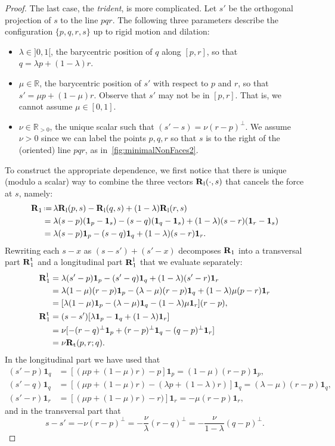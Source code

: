 \documentclass{amsart}
\theoremstyle{definition}
\newcommand{\R}{\mathbb{R}} %
\renewcommand{\b}[1]{{\boldsymbol{#1}}} %
\newcommand{\one}{\mathbf{1}} %
\newcommand{\eqdef}{\mbox{\,\raisebox{0.2ex}{\scriptsize\ensuremath{\mathrm:}}\ensuremath{=}\,}} %
\newcommand{\Rvector}{\b{\rm R}} %
\newcommand{\lon}{\operatorname{l}} %
\newcommand{\trans}{\operatorname{t}} %
\newcommand{\Rlong}{\Rvector_{\lon}} %
\newcommand{\Rtrans}{\Rvector_{\trans}} %
\begin{document}
\begin{proof}
\medskip
The last case, the \emph{trident}, is more complicated. Let $s'$ be the orthogonal projection of $s$ to the line $pqr$.
The following three parameters  describe the configuration $\{p,q,r,s\}$ up to rigid motion and dilation: 
\begin{itemize}
\item $\lambda\in {]0,1[}$, the barycentric position of $q$ along $[p,r]$, so that $q=\lambda p + (1-\lambda) r$.
\item $\mu\in \R$, the barycentric position of $s'$ with respect to  $p$ and $r$, so that $s'=\mu p + (1-\mu) r$. Observe that $s'$ may not be in $[p,r]$. That is, we cannot assume $\mu\in [0,1]$.
\item $\nu \in \R_{>0}$, the unique scalar such that $(s'-s) = \nu (r-p)^\perp$. We assume $\nu >0$ since we can label the points $p,q,r$ so that $s$ is to the right of the (oriented) line $pqr$, as in~\cref{fig:minimalNonFaces2}.
\end{itemize}

To construct the appropriate dependence, we first notice that there is unique (modulo a scalar) way to combine the three vectors $\Rlong(\cdot, s)$ that cancels the force at $s$, namely:
\begin{align*}
\Rvector_1 & \eqdef \lambda \Rlong(p,s) -  \Rlong(q,s) + (1-\lambda)\Rlong(r,s) \\
& = \lambda (s-p) (\one_p  - \one_s) - (s-q) (\one_q  - \one_s) + (1-\lambda) (s-r) (\one_r  - \one_s)\\
& = \lambda (s-p) \one_p  - (s-q) \one_q + (1-\lambda) (s-r) \one_r.
\end{align*}
Rewriting each $s-x$ as $(s-s')+(s'-x)$ decomposes $\Rvector_1$ into a transversal  part $\Rvector_1^{\trans}$ and a longitudinal part  $\Rvector_1^{\lon}$ that we evaluate separately:
\begin{align*}
\Rvector_1^{\lon} & = \lambda (s'-p) \one_p  - (s'-q) \one_q + (1-\lambda) (s'-r) \one_r\\
& = \lambda (1-\mu) (r-p) \one_p   - (\lambda - \mu) (r-p) \one_q  + (1-\lambda) \mu (p-r) \one_r\\
& = [\lambda (1-\mu)  \one_p   - (\lambda - \mu) \one_q  - (1-\lambda) \mu \one_r](r-p),\\
\Rvector_1^{\trans} & = (s-s') [\lambda \one_p - \one_q + (1-\lambda)  \one_r]\\
& = \nu[-(r-q)^\perp \one_p +  (r-p)^\perp \one_q - (q-p)^\perp \one_r]\\
& = \nu \Rtrans(p,r;q).
\end{align*}
In the longitudinal part we have used that
\begin{align*} 
(s'-p) \one_q & = [ (\mu p + (1-\mu) r)- p ] \one_p =  (1 - \mu) (r-p) \one_p, \\
(s'-q) \one_q & = [ (\mu p + (1-\mu) r)- (\lambda p + (1-\lambda) r) ] \one_q =  (\lambda - \mu) (r-p) \one_q, \\
(s'-r) \one_r & = [ (\mu p + (1-\mu) r)-  r) ] \one_r =  - \mu (r-p) \one_r,
\end{align*}
and in the transversal part that
\[
s-s' = - \nu (r-p)^\perp = - \frac\nu{\lambda} (r-q)^\perp = - \frac\nu{1-\lambda} (q-p)^\perp.
\]


\end{proof}
\end{document}
